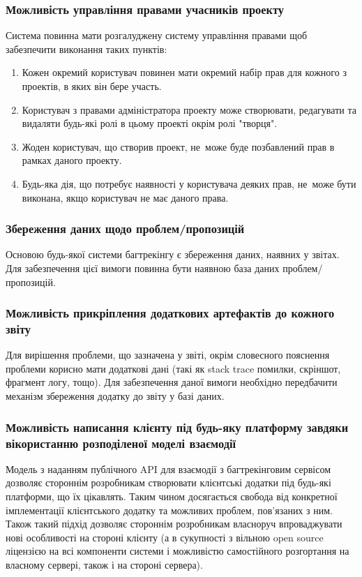 \documentclass[../main.tex]{subfiles}
\begin{document}
\subsubsection{Можливість управління правами учасників проекту}
Система повинна мати розгалуджену систему управління правами щоб забезпечити виконання таких пунктів:
\begin{enumerate}
    \item Кожен окремий користувач повинен мати окремий набір прав для кожного з проектів, в яких він бере участь.
    \item Користувач з правами адміністратора проекту може створювати, редагувати та видаляти будь-які ролі в цьому проекті окрім ролі "творця".
    \item Жоден користувач, що створив проект, не~може буде позбавлений прав в рамках даного проекту.
    \item Будь-яка дія, що потребує наявності у користувача деяких прав, не~може бути виконана, якщо користувач не має даного права.
\end{enumerate}

\subsubsection{Збереження даних щодо проблем/пропозицій}
Основою будь-якої системи багтрекінгу є збереження даних, наявних у звітах. Для забезпечення цієї вимоги повинна бути наявною база даних проблем/пропозицій.

\subsubsection{Можливість прикріплення додаткових артефактів до кожного звіту}
Для вирішення проблеми, що зазначена у звіті, окрім словесного пояснення проблеми корисно мати додаткові дані (такі як stack trace помилки, скріншот, фрагмент логу, тощо). Для забезпечення даної вимоги необхідно передбачити механізм збереження додатку до звіту у базі даних.

\subsubsection{Можливість написання клієнту під будь-яку платформу завдяки вікористанню розподіленої моделі взаємодії}
Модель з наданням публічного API для взаємодії з багтрекінговим сервісом дозволяє стороннім розробникам створювати клієнтські додатки під будь-які платформи, що їх цікавлять. Таким чином досягається свобода від конкретної імплементації клієнтського додатку та можливих проблем, пов'язаних з ним. Також такий підхід дозволяє стороннім розробникам власноруч впроваджувати нові особливості на стороні клієнту (а в сукупності з вільною open source ліцензією на всі компоненти системи і можливістю самостійного розгортання на власному сервері, також і на стороні сервера).
\end{document}
